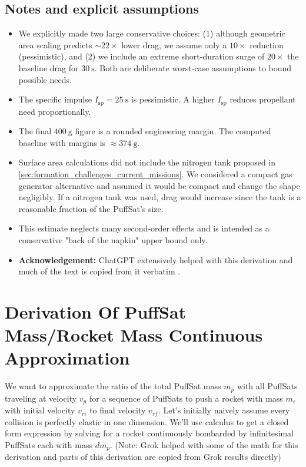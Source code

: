 \documentclass{article}
\begin{document}
\subsection*{Notes and explicit assumptions}
\begin{itemize}
  \item We explicitly made two large conservative choices: (1) although geometric area scaling predicts \(\sim22\times\) lower drag, we assume only a \(10\times\) reduction (pessimistic), and (2) we include an extreme short-duration surge of \(20\times\) the baseline drag for \(\SI{30}{\s}\).  Both are deliberate worst-case assumptions to bound possible needs.
  \item The specific impulse \(I_{\mathrm{sp}}=\SI{25}{\s}\) is pessimistic. A higher \(I_{\mathrm{sp}}\) reduces propellant need proportionally.
  \item The final \(\SI{400}{\g}\) figure is a rounded engineering margin. The computed baseline with margins is \(\approx\SI{374}{\g}\).
  \item Surface area calculations did not include the nitrogen tank proposed in \autoref{sec:formation_challenges_current_missions}.  We considered a compact gas generator alternative and assumed it would be compact and change the shape negligibly.   If a nitrogen tank was used, drag would increase since the tank is a reasonable fraction of the PuffSat's size.
  \item This estimate neglects many second-order effects and is intended as a conservative "back of the napkin" upper bound only.
  \item \textbf{Acknowledgement:} ChatGPT extensively helped with this derivation and much of the text is copied from it verbatim \cite{chatgpt}.
\end{itemize}



\section{Derivation Of PuffSat Mass/Rocket Mass Continuous Approximation}\label{sec:PuffSat_ratio_approximation}  We want to approximate the ratio of the total PuffSat mass \(m_p\) with all PuffSats traveling at velocity \(v_p\) for a sequence of PuffSats to push a rocket with mass \(m_r\) with initial velocity \(v_{ri}\) to final velocity \(v_{rf}\).   Let's initially naively assume every collision is perfectly elastic in one dimension.   We'll use calculus to get a  closed form expression by solving for a rocket  continuously bombarded by infinitesimal PuffSats each with mass \(dm_p\).   (Note: Grok \cite{grok}  helped with some of the math for this derivation and parts of this derivation are copied from Grok  results directly)
\end{document}
